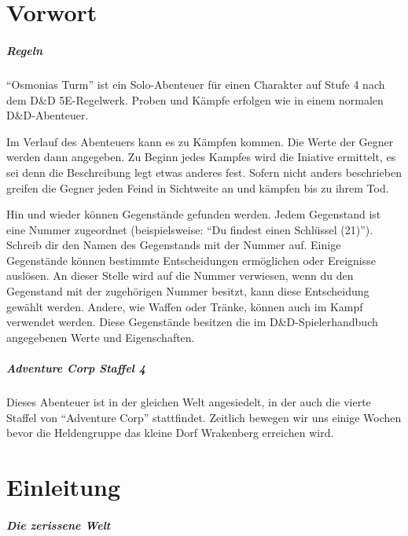 
\chapter{Vorwort}

\paragraph{Regeln}

``Osmonias Turm'' ist ein Solo-Abenteuer für einen Charakter auf Stufe 4 nach dem D\&D 5E-Regelwerk. Proben und Kämpfe erfolgen wie in einem normalen D\&D-Abenteuer.

Im Verlauf des Abenteuers kann es zu Kämpfen kommen. Die Werte der Gegner werden dann angegeben. Zu Beginn jedes Kampfes wird die Iniative ermittelt, es sei denn die Beschreibung legt etwas anderes fest. Sofern nicht anders beschrieben greifen die Gegner jeden Feind in Sichtweite an und kämpfen bis zu ihrem Tod.

Hin und wieder können Gegenstände gefunden werden. Jedem Gegenstand ist eine Nummer zugeordnet (beispielsweise: ``Du findest einen Schlüssel (21)''). Schreib dir den Namen des Gegenstands mit der Nummer auf. Einige Gegenstände können bestimmte Entscheidungen ermöglichen oder Ereignisse auslösen. An dieser Stelle wird auf die Nummer verwiesen, wenn du den Gegenstand mit der zugehörigen Nummer besitzt, kann diese Entscheidung gewählt werden. Andere, wie Waffen oder Tränke, können auch im Kampf verwendet werden. Diese Gegenstände besitzen die im D\&D-Spielerhandbuch angegebenen Werte und Eigenschaften.

\paragraph{Adventure Corp Staffel 4}

Dieses Abenteuer ist in der gleichen Welt angesiedelt, in der auch die vierte Staffel von ``Adventure Corp'' stattfindet. Zeitlich bewegen wir uns einige Wochen bevor die Heldengruppe das kleine Dorf Wrakenberg erreichen wird.

\chapter{Einleitung}

\paragraph{Die zerissene Welt}


